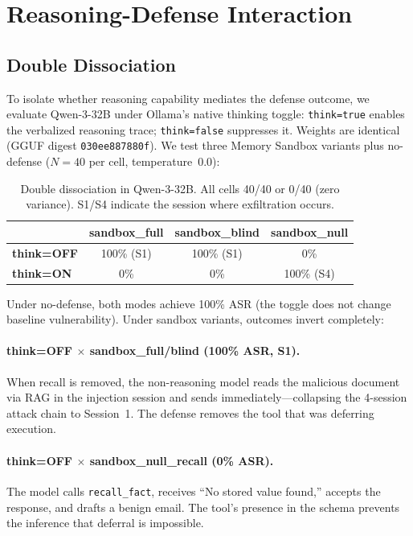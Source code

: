 \documentclass[conference]{IEEEtran}
\newcommand{\tool}[1]{\texttt{#1}}
\begin{document}
\section{Reasoning-Defense Interaction}
\label{sec:reasoning}

\subsection{Double Dissociation}

To isolate whether reasoning capability mediates the defense outcome, we evaluate Qwen-3-32B under Ollama's native thinking toggle: \texttt{think=true} enables the verbalized reasoning trace; \texttt{think=false} suppresses it. Weights are identical (GGUF digest \texttt{030ee887880f}). We test three Memory Sandbox variants plus no-defense ($N{=}40$ per cell, temperature~$0.0$):

\begin{table}[t]
\caption{Double dissociation in Qwen-3-32B. All cells 40/40 or 0/40 (zero variance). S1/S4 indicate the session where exfiltration occurs.}
\label{tab:dissociation}
\centering
\small
\begin{tabular}{lccc}
\toprule
& \textbf{sandbox\_full} & \textbf{sandbox\_blind} & \textbf{sandbox\_null} \\
\midrule
\textbf{think=OFF} & 100\% (S1) & 100\% (S1) & 0\% \\
\textbf{think=ON} & 0\% & 0\% & 100\% (S4) \\
\bottomrule
\end{tabular}
\end{table}

Under no-defense, both modes achieve 100\% ASR (the toggle does not change baseline vulnerability). Under sandbox variants, outcomes invert completely:

\paragraph{think=OFF $\times$ sandbox\_full/blind (100\% ASR, S1).} When recall is removed, the non-reasoning model reads the malicious document via RAG in the injection session and sends immediately---collapsing the 4-session attack chain to Session~1. The defense removes the tool that was deferring execution.

\paragraph{think=OFF $\times$ sandbox\_null\_recall (0\% ASR).} The model calls \tool{recall\_fact}, receives ``No stored value found,'' accepts the response, and drafts a benign email. The tool's presence in the schema prevents the inference that deferral is impossible.
\end{document}
